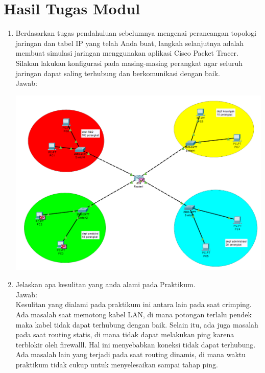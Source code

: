 \section{Hasil Tugas Modul}
\begin{enumerate}
    \item Berdasarkan tugas pendahuluan sebelumnya mengenai perancangan 
    topologi jaringan dan tabel IP yang telah Anda buat, langkah selanjutnya 
    adalah membuat simulasi jaringan menggunakan aplikasi Cisco Packet 
    Tracer. Silakan lakukan konfigurasi pada masing-masing perangkat agar 
    seluruh jaringan dapat saling terhubung dan berkomunikasi dengan baik. \\
    Jawab: \\
    \begin{center}
        \includegraphics[scale=0.3]{P1/img/topology.png}
    \end{center}

    \item Jelaskan apa kesulitan yang anda alami pada Praktikum. \\
    Jawab: \\
    Kesulitan yang dialami pada praktikum ini antara lain pada saat crimping.
    Ada masalah saat memotong kabel LAN, di mana potongan terlalu pendek maka 
    kabel tidak dapat terhubung dengan baik. Selain itu, ada juga masalah pada 
    saat routing statis, di mana tidak dapat melakukan ping karena terblokir 
    oleh firewalll. Hal ini menyebabkan koneksi tidak dapat terhubung. Ada 
    masalah lain yang terjadi pada saat routing dinamis, di mana waktu 
    praktikum tidak cukup untuk menyelesaikan sampai tahap ping.
    
\end{enumerate}
